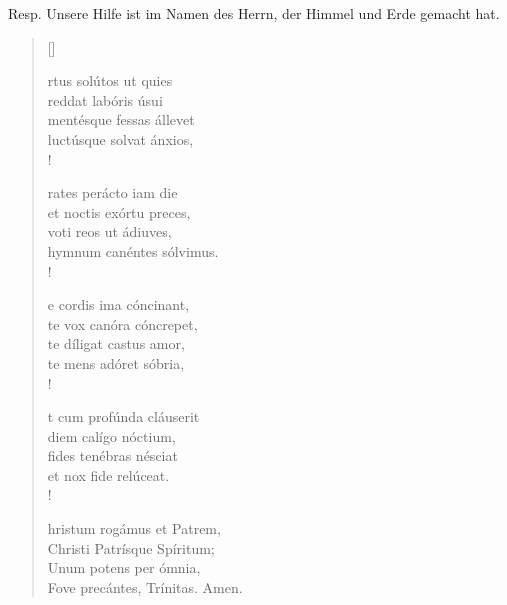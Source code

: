 



\def\greinitialformat#1{{\fontsize{40}{40}\selectfont #1}}
\resp


Resp. Unsere Hilfe ist im Namen des Herrn, der Himmel und Erde gemacht hat.

\vspace{0.3cm}



\def\greinitialformat#1{{\fontsize{40}{40}\selectfont #1}}
\gresetfirstlineaboveinitial{\small \textcolor{red}{hieme}}{}
\setaboveinitialseparation{0.72mm}

\vspace{0.3cm}

\begin{verse}[\versewidth]
 


 
rtus solútos ut quies\\
reddat labóris úsui\\
mentésque fessas állevet\\
luctúsque solvat ánxios,\\!

rates perácto iam die\\
et noctis exórtu preces,\\ 
voti reos ut ádiuves,\\ 
hymnum canéntes sólvimus.\\!

e cordis ima cóncinant, \\
te vox canóra cóncrepet, \\
te díligat castus amor, \\
te mens adóret sóbria, \\!

t cum profúnda cláuserit\\
diem calígo nóctium,\\ 
fides tenébras nésciat\\
et nox fide relúceat.\\!

hristum rogámus et Patrem,\\ 
Christi Patrísque Spíritum;\\
Unum potens per ómnia,\\ 
Fove precántes, Trínitas. Amen.
\end{verse}

